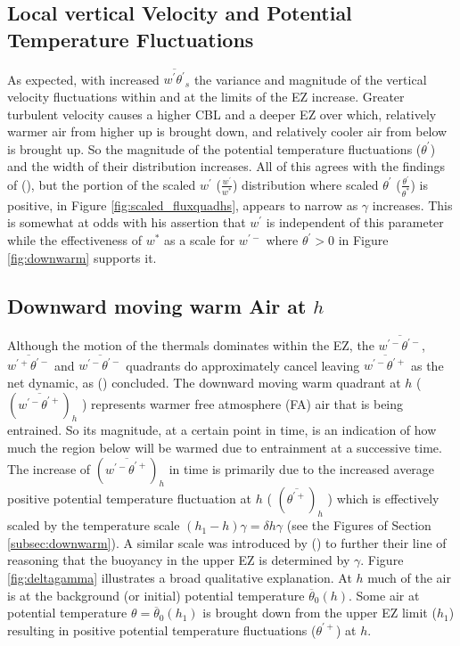 \subsection{Local vertical Velocity and Potential Temperature Fluctuations}

As expected, with increased $\overline{w^{'}\theta^{'}}_{s}$ the variance and magnitude of the vertical velocity fluctuations within and at the limits of the \acs{EZ} increase.  Greater turbulent velocity causes a higher \acs{CBL} and a deeper \acs{EZ} over which, relatively warmer air from higher up is brought down, and relatively cooler air from below is brought up.  So the magnitude of the potential temperature fluctuations ($\theta^{'}$) and the width of their distribution increases. All of this agrees with the findings of \citeauthor{Sorbjan1} (\citeyear{Sorbjan1}), but the portion of the scaled $w^{'}$ ($\frac{w^{'}}{w^{*}}$) distribution where scaled $\theta^{'}$ ($\frac{\theta^{'}}{\theta^{*}}$) is positive, in Figure \ref{fig:scaled_fluxquadhs}, appears to narrow as $\gamma$ increases. This is somewhat at odds with his assertion that $w^{'}$ is independent of this parameter while the effectiveness of $w^{*}$ as a scale for $w^{'-}$ where $\theta^{'}>0$ in Figure \ref{fig:downwarm} supports it.\\

\subsection{Downward moving warm Air at $h$}

 Although the motion of the thermals dominates within the \acs{EZ}, the $\overline{w^{'-}\theta^{'-}}$, $\overline{w^{'+}\theta^{'-}}$ and $\overline{w^{'-}\theta^{'-}}$ quadrants do approximately cancel leaving $\overline{w^{'-}\theta^{'+}}$ as the net dynamic, as \citeauthor{SullMoengStev} (\citeyear{SullMoengStev}) concluded. The downward moving warm quadrant at $h$ ( $(\overline{w^{'-}\theta^{'+}})_{h}$ ) represents warmer free atmosphere (\acs{FA}) air that is being entrained.  So its magnitude, at a certain point in time, is an indication of how much the region below will be warmed due to entrainment at a successive time.  The increase of $(\overline{w^{'-}\theta^{'+}})_{h}$ in time is primarily due to the increased average positive potential temperature fluctuation at $h$ ( $(\overline{\theta^{'+}})_{h}$ ) which is effectively scaled by the temperature scale $(h_{1}-h)\gamma = \delta h \gamma$ (see the Figures of Section \ref{subsec:downwarm}).  A similar scale was introduced by \citeauthor{GarciaMellado} (\citeyear{GarciaMellado}) to further their line of reasoning that the buoyancy in the upper \acs{EZ} is determined by $\gamma$. Figure \ref{fig:deltagamma} illustrates a broad qualitative explanation.  At $h$ much of the air is at the background (or initial) potential temperature $\overline{\theta}_{0}(h)$.  Some air at potential temperature $\theta = \overline{\theta}_{0}(h_{1})$ is brought down from the upper \acs{EZ} limit ($h_{1}$) resulting in positive potential temperature fluctuations ($\theta^{'+}$) at $h$.\\


